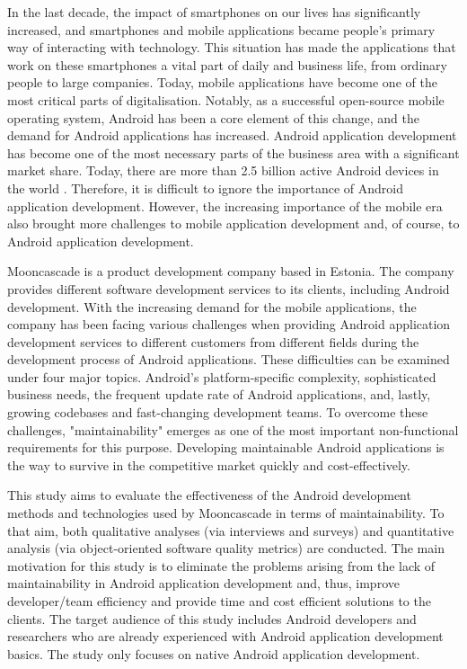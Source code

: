 In the last decade, the impact of smartphones on our lives has significantly increased, and smartphones and mobile applications became people's primary way of interacting with technology. This situation has made the applications that work on these smartphones a vital part of daily and business life, from ordinary people to large companies. Today, mobile applications have become one of the most critical parts of digitalisation. Notably, as a successful open-source mobile operating system, Android has been a core element of this change, and the demand for Android applications has increased. Android application development has become one of the most necessary parts of the business area with a significant market share. Today, there are more than 2.5 billion active Android devices in the world \cite{1} . Therefore, it is difficult to ignore the importance of Android application development.
However, the increasing importance of the mobile era also brought more challenges to mobile application development and, of course, to Android application development.

Mooncascade is a  product development company based in Estonia. The company provides different software development services to its clients, including Android development. With the increasing demand for the mobile applications, the company has been facing various challenges when providing Android application development services to different customers from different fields during the development process of Android applications. These difficulties can be examined under four major topics. Android's platform-specific complexity, sophisticated business needs, the frequent update rate of Android applications, and, lastly, growing codebases and fast-changing development teams. To overcome these challenges, "maintainability" emerges as one of the most important non-functional requirements for this purpose. Developing maintainable Android applications is the way to survive in the competitive market quickly and cost-effectively. 

This study aims to evaluate the effectiveness of the Android development methods and technologies used by Mooncascade in terms of maintainability. To that aim, both qualitative analyses (via interviews and surveys) and quantitative analysis (via object-oriented software quality metrics) are conducted. The main motivation for this study is to eliminate the problems arising from the lack of maintainability in Android application development and, thus, improve developer/team efficiency and provide time and cost efficient solutions to the clients. The target audience of this study includes Android developers and researchers who are already experienced with Android application development basics. The study only focuses on native Android application development.
 
